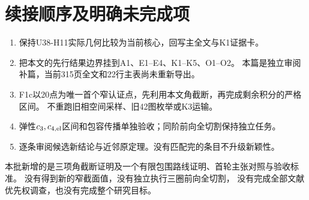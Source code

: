 \documentclass[11pt,a4paper]{ctexart}
\theoremstyle{cnplain}\newtheorem{proposition}{命题}[section]
\begin{document}
\section{续接顺序及明确未完成项}
\begin{enumerate}
\item 保持U38-H11实际几何比较为当前核心，回写主全文与K1证据卡。
\item 把本文的先行结果边界挂到A1、E1--E4、K1--K5、O1--O2。
本篇是独立审阅补篇，当前315页全文和22行主表尚未重新导出。
\item F1c以20点为唯一首个窄认证点，先利用本文角截断，再完成剩余积分的严格区间。
不重跑旧相空间采样、旧42图枚举或K3运输。
\item 弹性$c_3,c_{4,\rm el}$区间和包容传播单独验收；同阶前向全切割保持独立任务。
\item 逐条审阅候选新结论与近邻原定理。没有匹配完的条目不升级新颖性。
\end{enumerate}
本批新增的是三项角截断证明及一个有限包围路线证明、首轮主张对照与验收标准。
没有得到新的窄截面值，没有独立执行三圈前向全切割，
没有完成全部文献优先权调查，也没有完成整个研究目标。
\end{document}
